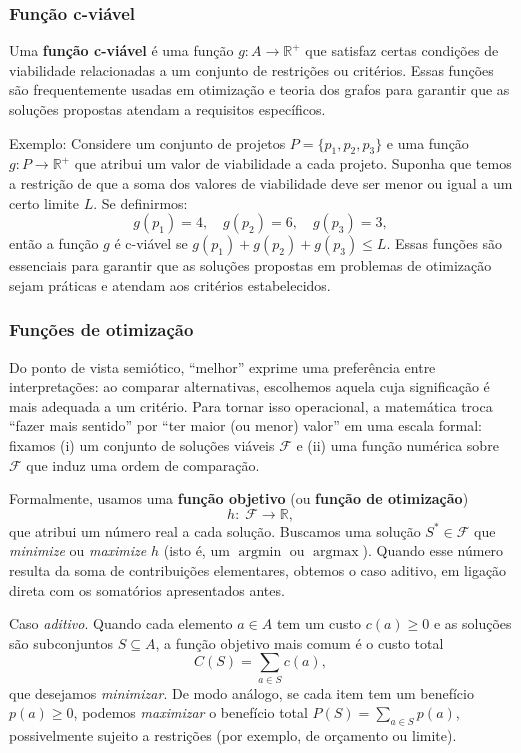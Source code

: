 \subsubsection{Função c-viável}

Uma \textbf{função c-viável} é uma função \(g: A \to \mathbb{R}^+\) que satisfaz certas condições de viabilidade relacionadas a um conjunto de restrições ou critérios. Essas funções são frequentemente usadas em otimização e teoria dos grafos para garantir que as soluções propostas atendam a requisitos específicos.

Exemplo: Considere um conjunto de projetos \(P = \{p_1, p_2, p_3\}\) e uma função \(g: P \to \mathbb{R}^+\) que atribui um valor de viabilidade a cada projeto. Suponha que temos a restrição de que a soma dos valores de viabilidade deve ser menor ou igual a um certo limite \(L\). Se definirmos:
\[g(p_1) = 4, \quad g(p_2) = 6, \quad g(p_3) = 3,\]
então a função \(g\) é c-viável se \(g(p_1) + g(p_2) + g(p_3) \leq L\).
Essas funções são essenciais para garantir que as soluções propostas em problemas de otimização sejam práticas e atendam aos critérios estabelecidos.

\subsubsection{Funções de otimização}


Do ponto de vista semiótico, “melhor” exprime uma preferência entre interpretações: ao comparar alternativas, escolhemos aquela cuja significação é mais adequada a um critério. Para tornar isso operacional, a matemática troca “fazer mais sentido” por “ter maior (ou menor) valor” em uma escala formal: fixamos (i) um conjunto de soluções viáveis \(\mathcal{F}\) e (ii) uma função numérica sobre \(\mathcal{F}\) que induz uma ordem de comparação.


Formalmente, usamos uma \textbf{função objetivo} (ou \textbf{função de otimização})
\[h:\; \mathcal{F} \to \mathbb{R},\]
que atribui um número real a cada solução. Buscamos uma solução \(S^*\in\mathcal{F}\) que \emph{minimize} ou \emph{maximize} \(h\) (isto é, um \(\operatorname*{argmin}\) ou \(\operatorname*{argmax}\)). Quando esse número resulta da soma de contribuições elementares, obtemos o caso aditivo, em ligação direta com os somatórios apresentados antes.


Caso \emph{aditivo}. Quando cada elemento \(a\in A\) tem um custo \(c(a)\ge 0\) e as soluções são subconjuntos \(S\subseteq A\), a função objetivo mais comum é o custo total
\[C(S)=\sum_{a\in S} c(a),\]
que desejamos \emph{minimizar}. De modo análogo, se cada item tem um benefício \(p(a)\ge 0\), podemos \emph{maximizar} o benefício total \(P(S)=\sum_{a\in S} p(a)\), possivelmente sujeito a restrições (por exemplo, de orçamento ou limite).



